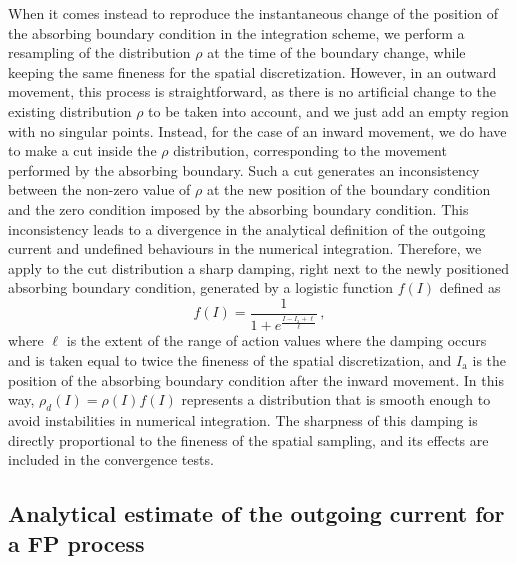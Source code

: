 \begin{chapterappendices}
When it comes instead to reproduce the instantaneous change of the position of the absorbing boundary condition in the integration scheme, we perform a resampling of the distribution $\rho$ at the time of the boundary change, while keeping the same fineness for the spatial discretization. However, in an outward movement, this process is straightforward, as there is no artificial change to the existing distribution $\rho$ to be taken into account, and we just add an empty region with no singular points. Instead, for the case of an inward movement, we do have to make a cut inside the $\rho$ distribution, corresponding to the movement performed by the absorbing boundary. Such a cut generates an inconsistency between the non-zero value of $\rho$ at the new position of the boundary condition and the zero condition imposed by the absorbing boundary condition. This inconsistency leads to a divergence in the analytical definition of the outgoing current and undefined behaviours in the numerical integration. Therefore, we apply to the cut distribution a sharp damping, right next to the newly positioned absorbing boundary condition, generated by a logistic function $f(I)$ defined as
\begin{equation}
    f(I) = \frac{1}{1 + e^{\frac{I-I_\text{a}+\ell}{\ell}}} \, , 
    \label{eq:logistic_damping}   
\end{equation}
where $\ell$ is the extent of the range of action values where the damping occurs and is taken equal to twice the fineness of the spatial discretization, and $I_\text{a}$ is the position of the absorbing boundary condition after the inward movement. In this way, $\rho_d(I) = \rho(I) f(I)$ represents a distribution that is smooth enough to avoid instabilities in numerical integration. The sharpness of this damping is directly proportional to the fineness of the spatial sampling, and its effects are included in the convergence tests.


\subsection{Analytical estimate of the outgoing current for a FP process}
\label{app_sec:analytic_estimate_of_the_current_loss}



\end{chapterappendices}
